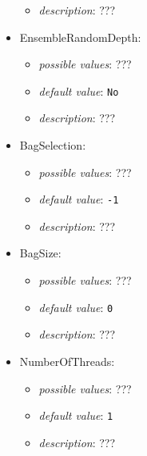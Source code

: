 \documentclass{article}
\begin{document}
\begin{itemize}
\begin{itemize}
                \item \emph{description}: ???
           \end{itemize}
    \item EnsembleRandomDepth:
           \begin{itemize}
                \item \emph{possible values}: ???
                \item \emph{default value}: \texttt{No}
                \item \emph{description}: ???
           \end{itemize}
    \item BagSelection:
           \begin{itemize}
                \item \emph{possible values}: ???
                \item \emph{default value}: \texttt{-1}
                \item \emph{description}: ???
           \end{itemize}
    \item BagSize:
           \begin{itemize}
                \item \emph{possible values}: ???
                \item \emph{default value}: \texttt{0}
                \item \emph{description}: ???
           \end{itemize}
    \item NumberOfThreads:
           \begin{itemize}
                \item \emph{possible values}: ???
                \item \emph{default value}: \texttt{1}
                \item \emph{description}: ???
           \end{itemize}
\end{itemize}
\end{document}
